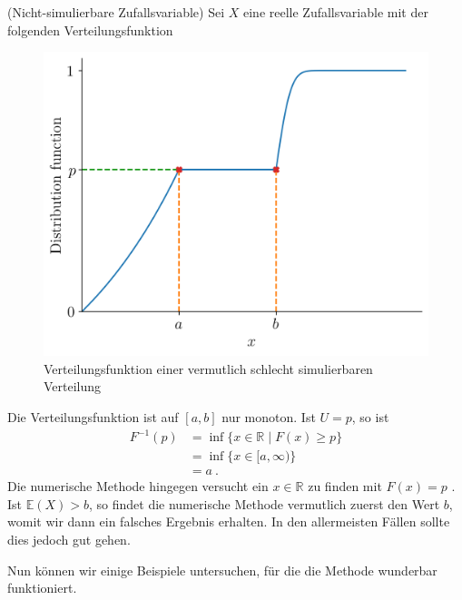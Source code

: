 \begin{Beispiel}{(Nicht-simulierbare Zufallsvariable)}
Sei $X$ eine reelle Zufallsvariable mit der folgenden Verteilungsfunktion

\begin{figure}[H]
\centering
\includegraphics[width=0.5\linewidth]{./Section/Simulation/Nicht Simulierbar.png}
\caption{Verteilungsfunktion einer vermutlich schlecht simulierbaren Verteilung}
\end{figure}

Die Verteilungsfunktion ist auf $[a, b]$ nur monoton. Ist $U = p$, so ist
\begin{align*}
F^{-1}(p) &= \inf\{ x \in \mathbb{R} \mid F(x) \geq p\}\\
&= \inf\{ x \in [a, \infty)\}\\
&= a~.
\end{align*}
Die numerische Methode hingegen versucht ein $x \in \mathbb{R}$ zu finden mit $F(x) = p$ . Ist $\mathbb{E}(X) > b$, so findet die numerische Methode vermutlich zuerst den Wert $b$, womit wir dann ein falsches Ergebnis erhalten. In den allermeisten Fällen sollte dies jedoch gut gehen.
\end{Beispiel}

\newpage

Nun können wir einige Beispiele untersuchen, für die die Methode wunderbar funktioniert.


